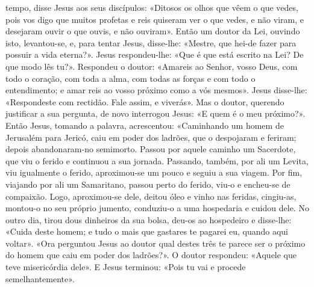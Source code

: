 \begin{paracol}{2}
{ tempo, disse Jesus aos seus discípulos: «Ditosos os olhos que vêem o que vedes, pois vos digo que muitos profetas e reis quiseram ver o que vedes, e não viram, e desejaram ouvir o que ouvis, e não ouviram». Então um doutor da Lei, ouvindo isto, levantou-se, e, para tentar Jesus, disse-lhe: «Mestre, que hei-de fazer para possuir a vida eterna?». Jesus respondeu-lhe: «Que é que está escrito na Lei? De que modo lês tu?». Respondeu o doutor: «Amareis ao Senhor, vosso Deus, com todo o coração, com toda a alma, com todas as forças e com todo o entendimento; e amar reis ao vosso próximo como a vós mesmos». Jesus disse-lhe: «Respondeste com rectidão. Fale assim, e viverás». Mas o doutor, querendo justificar a sua pergunta, de novo interrogou Jesus: «E quem é o meu próximo?». Então Jesus, tomando a palavra, acrescentou: «Caminhando um homem de Jerusalém para Jericó, caiu em poder dos ladrões, que o despojaram e feriram; depois abandonaram-no semimorto. Passou por aquele caminho um Sacerdote, que viu o ferido e continuou a sua jornada. Passando, também, por ali um Levita, viu igualmente o ferido, aproximou-se um pouco e seguiu a sua viagem. Por fim, viajando por ali um Samaritano, passou perto do ferido, viu-o e encheu-se de compaixão. Logo, aproximou-se dele, deitou óleo e vinho nas feridas, cingiu-as, montou-o no seu próprio jumento, conduziu-o a uma hospedaria e cuidou dele. No outro dia, tirou dous dinheiros da sua bolsa, deu-os ao hospedeiro e disse-lhe: «Cuida deste homem; e tudo o mais que gastares te pagarei eu, quando aqui voltar». «Ora perguntou Jesus ao doutor qual destes três te parece ser o próximo do homem que caiu em poder dos ladrões?». O doutor respondeu: «Aquele que teve misericórdia dele». E Jesus terminou: «Pois tu vai e procede semelhantemente».
}\end{paracol}

\begin{paracol}{2}\switchcolumn{}\end{paracol}

